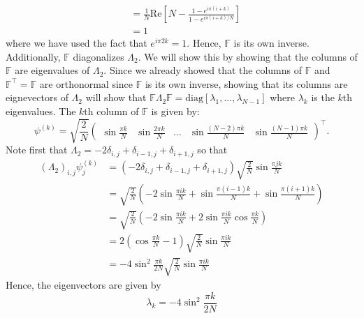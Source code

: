 \documentclass[reqno]{article}
\begin{document}
	\begin{equation}
	\begin{split}
		&= \frac{1}{N} \text{Re} \left[ N - \frac{1 - e^{i\pi(i + k)}}{1 - e^{i \pi (i + k)/N}} \right] \\
		&= 1
	\end{split}
	\end{equation}
	where we have used the fact that $e^{i\pi 2k} = 1$. Hence, $\mathbb{F}$ is its own inverse. Additionally, $\mathbb{F}$ diagonalizes $\Lambda_2$. We will show this by showing that the columns of $\mathbb{F}$ are eigenvalues of $\Lambda_2$. Since we already showed that the columns of $\mathbb{F}$ and $\mathbb{F}^\top = \mathbb{F}$ are orthonormal since $\mathbb{F}$ is its own inverse, showing that its columns are eignevectors of $\Lambda_2$ will show that $\mathbb{F} \Lambda_2 \mathbb{F} = \text{diag}[\lambda_1, ..., \lambda_{N - 1}]$ where $\lambda_k$ is the $k$th eigenvalues. The $k$th column of $\mathbb{F}$ is given by:
	\begin{equation}
		\psi^{(k)} = \sqrt{\frac{2}{N}}\begin{pmatrix}
		\sin \frac{\pi k}{N}&
		\sin \frac{2 \pi k}{N}&
		\dots&
		\sin \frac{(N-2) \pi k}{N}&
		\sin \frac{(N-1) \pi k}{N}
		\end{pmatrix}^\top.
	\end{equation}
	Note first that $\Lambda_2 = -2\delta_{i, j} + \delta_{i - 1, j} + \delta_{i + 1, j}$ so that
	\begin{equation}
	\begin{split}
		\left(\Lambda_2\right)_{i, j} \psi^{(k)}_j &= \left( -2\delta_{i, j} + \delta_{i - 1, j} + \delta_{i + 1, j} \right) \sqrt{\frac{2}{N}} \sin \frac{\pi jk}{N} \\
		&= \sqrt{\frac{2}{N}} \left( -2\sin \frac{\pi ik}{N} + \sin \frac{\pi (i - 1)k}{N}  + \sin \frac{\pi (i + 1)k}{N} \right) \\
		&= \sqrt{\frac{2}{N}} \left( -2\sin \frac{\pi i k}{N} + 2\sin \frac{\pi i k}{N} \cos \frac{\pi k}{N} \right) \\
		&= 2\left( \cos \frac{\pi k}{N} - 1 \right) \sqrt{\frac{2}{N}} \sin \frac{\pi i k}{N} \\
		&= -4 \sin^2 \frac{\pi k}{2 N} \sqrt{\frac{2}{N}} \sin \frac{\pi i k}{N}
	\end{split}
	\end{equation}
	Hence, the eigenvectors are given by
	\begin{equation}
		\lambda_k = -4\sin^2 \frac{\pi k}{2N}
	\end{equation}
\end{document}
